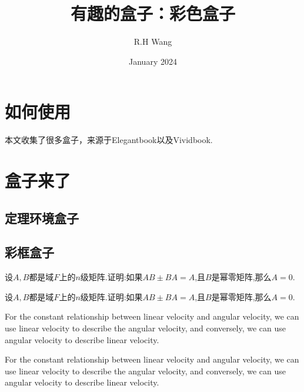 \documentclass[a4]{ctexart}
\title{有趣的盒子：彩色盒子}
\author{R.H Wang}
\date{January 2024}
\begin{document}
\maketitle
\section{如何使用}
本文收集了很多盒子，来源于Elegantbook以及Vividbook. 

\section{盒子来了}



\subsection{定理环境盒子}



\subsection{彩框盒子}
\begin{mybox1}
    设$A,B$都是域$F$上的$n$级矩阵.证明:如果$AB\pm BA=A$,且$B$是幂零矩阵,那么$A=0$.
\end{mybox1}

\begin{tcblisting}{}
\begin{mybox1}
    设$A,B$都是域$F$上的$n$级矩阵.证明:如果$AB\pm BA=A$,且$B$是幂零矩阵,那么$A=0$.
\end{mybox1}
\end{tcblisting}


\begin{marker}
    For the constant relationship between linear velocity and angular velocity, we can use linear velocity to describe the angular velocity, and conversely, we can use angular velocity to describe linear velocity.
\end{marker}

\begin{tcblisting}{}
\begin{marker}
    For the constant relationship between linear velocity and angular velocity, we can use linear velocity to describe the angular velocity, and conversely, we can use angular velocity to describe linear velocity.
\end{marker}
\end{tcblisting}
\end{document}
